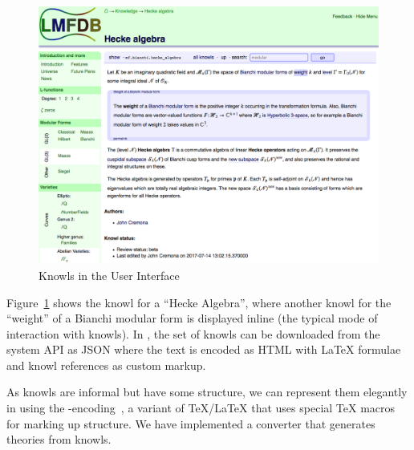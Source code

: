 \begin{figure}[ht]\centering
  \includegraphics[width=14cm]{knowl}
  \caption{Knowls in the \LMFDB User Interface}\label{fig:knowl}
\end{figure}

Figure~\ref{fig:knowl} shows the knowl for a ``Hecke Algebra'', where another knowl for the ``weight'' of a Bianchi modular form is displayed inline (the typical mode of interaction with knowls).
In \LMFDB, the set of knowls can be downloaded from the system API as JSON where the text is encoded as HTML with {\LaTeX} formulae and knowl references as custom markup.

As knowls are informal but have some structure, we can represent them elegantly in \ommt using the \sTeX-encoding~\cite{Kohlhase:ulsmf08,sTeX:github:on}, a variant of {\TeX/\LaTeX} that uses special {\TeX} macros for marking up \ommt structure.
We have implemented a converter that generates \sTeX theories from \LMFDB knowls.




